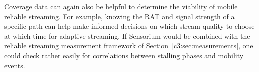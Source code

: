 Coverage data can again also be helpful to determine the viability of mobile reliable streaming. For example, knowing the \gls{RAT} and signal strength of a specific path can help make informed decisions on which stream quality to choose at which time for adaptive streaming. If Sensorium would be combined with the reliable streaming measurement framework of Section~\ref{c3:sec:measurements}, one could check rather easily for correlations between stalling phases and mobility events.











